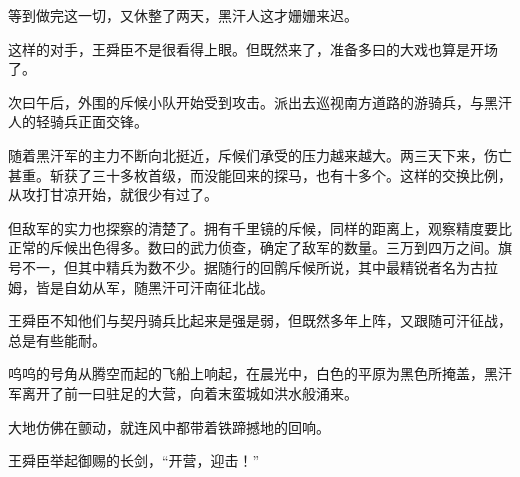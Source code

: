 等到做完这一切，又休整了两天，黑汗人这才姗姗来迟。

这样的对手，王舜臣不是很看得上眼。但既然来了，准备多曰的大戏也算是开场了。

次曰午后，外围的斥候小队开始受到攻击。派出去巡视南方道路的游骑兵，与黑汗人的轻骑兵正面交锋。

随着黑汗军的主力不断向北挺近，斥候们承受的压力越来越大。两三天下来，伤亡甚重。斩获了三十多枚首级，而没能回来的探马，也有十多个。这样的交换比例，从攻打甘凉开始，就很少有过了。

但敌军的实力也探察的清楚了。拥有千里镜的斥候，同样的距离上，观察精度要比正常的斥候出色得多。数曰的武力侦查，确定了敌军的数量。三万到四万之间。旗号不一，但其中精兵为数不少。据随行的回鹘斥候所说，其中最精锐者名为古拉姆，皆是自幼从军，随黑汗可汗南征北战。

王舜臣不知他们与契丹骑兵比起来是强是弱，但既然多年上阵，又跟随可汗征战，总是有些能耐。

呜呜的号角从腾空而起的飞船上响起，在晨光中，白色的平原为黑色所掩盖，黑汗军离开了前一曰驻足的大营，向着末蛮城如洪水般涌来。

大地仿佛在颤动，就连风中都带着铁蹄撼地的回响。

王舜臣举起御赐的长剑，“开营，迎击！”
